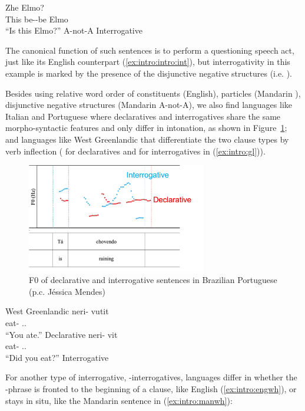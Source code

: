 \gll Zhe  Elmo?\\
This be-\Neg-be Elmo\\
``Is this Elmo?'' \hfill A-not-A Interrogative
\eex

The canonical function of such sentences is to perform a questioning speech act, just like its English counterpart (\ref{ex:intro:intro:int}), but interrogativity in this example is marked by the presence of the disjunctive negative structures (i.e. ). 

Besides using relative word order of constituents (English), particles (Mandarin ), disjunctive negative structures (Mandarin A-not-A), we also find languages like Italian and Portuguese where declaratives and interrogatives share the same morpho-syntactic features and only differ in intonation, as shown in Figure~\ref{fig:intro:PB}; and languages like West Greenlandic that differentiate the two clause types by verb inflection ( for declaratives and  for interrogatives in (\ref{ex:intro:gl})).

\begin{figure}[H]
    \centering
    \includegraphics[width=0.7\textwidth]{figures/PB.jpg}
    \caption{F0 of declarative and interrogative sentences in Brazilian Portuguese (p.c. J\'essica Mendes)}
    \label{fig:intro:PB}
\end{figure}


West Greenlandic
\bxl
\label{ex:intro:gl:dec}
\gll neri- vutit\\
eat- \Ind.\Ssg.\Pst{}\\
``You ate.'' \hfill Declarative
\ex \label{ex:intro:gl:int}
\gll neri- vit\\
eat- \Int.\Ssg.\Pst{}\\
``Did you eat?'' \hfill Interrogative
\exl
\hspace*{\fill} \cite[18, ex (50)]{konig2007}
\eex

For another type of interrogative, \twh-interrogatives, languages differ in whether the \twh-phrase is fronted to the beginning of a clause,  like English (\ref{ex:intro:engwh}), or stays in situ, like the Mandarin sentence in (\ref{ex:intro:manwh}):

